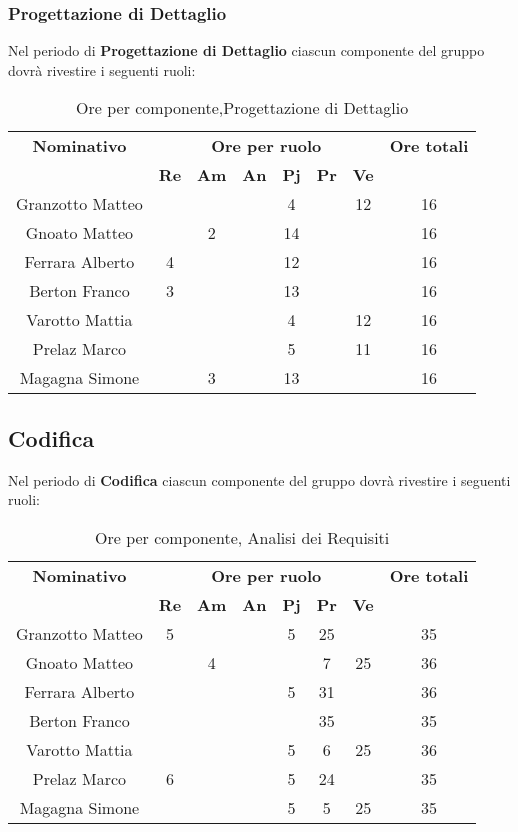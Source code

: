 \subsubsection{Progettazione di Dettaglio}
Nel periodo di \textbf{Progettazione di Dettaglio} ciascun componente del gruppo dovrà rivestire i seguenti ruoli:
\begin{table}[H]
	\begin{center}
		\begin{tabular}{|c|c|c|c|c|c|c|c|}
			\hline
			\textbf{Nominativo} & \multicolumn{6}{c|}{\textbf{Ore per ruolo}} & \textbf{Ore totali} \\
			& \textbf{Re} & \textbf{Am} & \textbf{An} & \textbf{Pj} & \textbf{Pr} & \textbf{Ve} & \\
			\hline
			Granzotto Matteo	&		&	 	&		&	4	&	 	& 	12	&	16	\\
			\hline
			Gnoato Matteo		&		&	2	&		&	14	&		&		&	16	\\
			\hline
			Ferrara Alberto		&	4	&		&		&	 12	&		&		& 	16	\\
			\hline
			Berton Franco		&	3	&		&		&	13	&		&		&	16	\\
			\hline
			Varotto Mattia 		&		&		&		&	4	&		&	12	& 	16	\\
			\hline
			Prelaz Marco 		& 		&		&		&	5	&		&	11	&	16	\\
			\hline
			Magagna Simone 		&		&	3	&		&	13	&		& 		&	16	\\
			\hline
		\end{tabular}
	\end{center}
	\caption{Ore per componente,Progettazione di Dettaglio}
\end{table}
\subsection{Codifica}
Nel periodo di \textbf{Codifica} ciascun componente del gruppo dovrà rivestire i seguenti ruoli:
\begin{table}[H]
	\begin{center}
		\begin{tabular}{|c|c|c|c|c|c|c|c|}
			\hline
			\textbf{Nominativo} & \multicolumn{6}{c|}{\textbf{Ore per ruolo}} & \textbf{Ore totali} \\
			& \textbf{Re} & \textbf{Am} & \textbf{An} & \textbf{Pj} & \textbf{Pr} & \textbf{Ve} & \\
			\hline
			Granzotto Matteo	&	5	&	 	&		&	5	&	25 	& 		&	35	\\
			\hline
			Gnoato Matteo		&		&	4	&		&		&	7	&	25	&	36	\\
			\hline
			Ferrara Alberto		&		&		&		&	 5	&	31	&		& 	36	\\
			\hline
			Berton Franco		&		&		&		&		&	35	&		&	35	\\
			\hline
			Varotto Mattia 		&		&		&		&	5	&	6	&	25	& 	36	\\
			\hline
			Prelaz Marco 		& 	6	&		&		&	5	&	24	&		&	35	\\
			\hline
			Magagna Simone 		&		&		&		&	5	&	5	& 	25	&	35	\\
			\hline
		\end{tabular}
	\end{center}
	\caption{Ore per componente, Analisi dei Requisiti}
\end{table}
